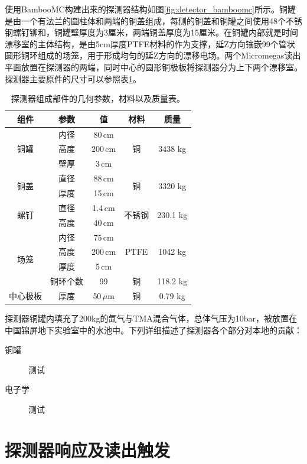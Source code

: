 使用BambooMC构建出来的探测器结构如图\ref{fig:detector_bamboomc}所示。铜罐是由一个有法兰的圆柱体和两端的铜盖组成，每侧的铜盖和铜罐之间使用48个不锈钢螺钉铆和，铜罐壁厚度为3厘米，两端铜盖厚度为15厘米。在铜罐内部就是时间漂移室的主体结构，是由5cm厚度PTFE材料的作为支撑，延Z方向镶嵌99个管状圆形铜环组成的场笼，用于形成均匀的延Z方向的漂移电场。两个Micromegas读出平面放置在探测器的两端，同时中心的圆形铜极板将探测器分为上下两个漂移室。探测器主要原件的尺寸可以参照表\ref{tab:parameters_geometry}。
\begin{table}[thb]
    \begin{center}
        \begin{tabular*}{0.75\textwidth}{@{\extracolsep{\fill}}ccccc}
        \hline
        \hline
        \textbf{组件} & \textbf{参数} & \textbf{值} & \textbf{材料} & \textbf{质量} \\ \hline
        \multirow{3}{*}{铜罐} & 内径 & 80\,cm & \multirow{3}{*}{铜} & \multirow{3}{*}{3438 kg} \\
                    & 高度 & 200\,cm &  &    \\   
                    & 壁厚 & 3\,cm &  &    \\\hline
        \multirow{2}{*}{铜盖} & 直径 & 88\,cm & \multirow{2}{*}{铜} & \multirow{2}{*}{3320 kg} \\
                    & 厚度 & 15\,cm &  &    \\\hline
        \multirow{2}{*}{螺钉} & 直径 & 1.4\,cm & \multirow{2}{*}{不锈钢} & \multirow{2}{*}{230.1 kg} \\
                    & 高度 & 40\,cm &  &    \\\hline
        \multirow{4}{*}{场笼} & 内径 & 75\,cm & \multirow{3}{*}{PTFE} & \multirow{3}{*}{1042 kg} \\
                    & 高度 & 200\,cm &  & \\ 
                    & 厚度 & 5\,cm &  & \\ 
                    & 铜环个数 & 99 &    \multirow{1}{*}{铜}  & 118.2 kg \\\hline
        中心极板 & 厚度   &   50\,$\mu$m     &   \multirow{1}{*}{铜}  &    0.79 kg   \\   
        \hline
        \hline
        \end{tabular*}
        \caption{探测器组成部件的几何参数，材料以及质量表。\supercite{cdr}}
        \label{tab:parameters_geometry}
    \end{center}
\end{table}
  
探测器铜罐内填充了200kg的氙气与TMA混合气体，总体气压为10bar，被放置在中国锦屏地下实验室中的水池中。下列详细描述了探测器各个部分对本地的贡献：


\begin{description}
    \item[铜罐] 测试
    \item[电子学] 测试
\end{description}


\section{探测器响应及读出触发}

